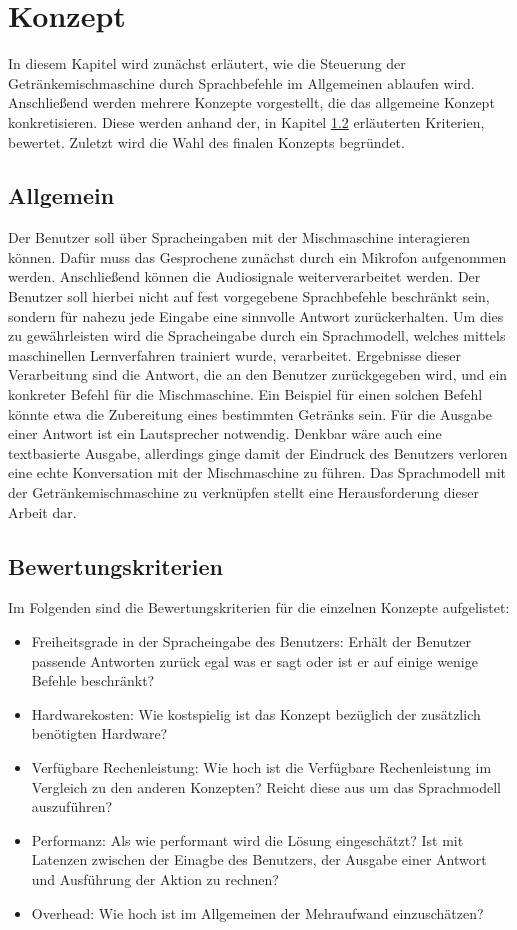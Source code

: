 \chapter{Konzept}
In diesem Kapitel wird zunächst erläutert, wie die Steuerung der Getränkemischmaschine durch Sprachbefehle im Allgemeinen ablaufen wird.
Anschließend werden mehrere Konzepte vorgestellt, die das allgemeine Konzept konkretisieren.
Diese werden anhand der, in Kapitel \ref{section:Bewertungskriterien} erläuterten Kriterien, bewertet.
Zuletzt wird die Wahl des finalen Konzepts begründet.
\section{Allgemein}
Der Benutzer soll über Spracheingaben mit der Mischmaschine interagieren können.
Dafür muss das Gesprochene zunächst durch ein Mikrofon aufgenommen werden.
Anschließend können die Audiosignale weiterverarbeitet werden.
Der Benutzer soll hierbei nicht auf fest vorgegebene Sprachbefehle beschränkt sein, sondern für nahezu jede Eingabe eine sinnvolle Antwort zurückerhalten.
Um dies zu gewährleisten wird die Spracheingabe durch ein Sprachmodell, welches mittels maschinellen Lernverfahren trainiert wurde, verarbeitet.
Ergebnisse dieser Verarbeitung sind die Antwort, die an den Benutzer zurückgegeben wird, und ein konkreter Befehl für die Mischmaschine.
Ein Beispiel für einen solchen Befehl könnte etwa die Zubereitung eines bestimmten Getränks sein.
Für die Ausgabe einer Antwort ist ein Lautsprecher notwendig.
Denkbar wäre auch eine textbasierte Ausgabe, allerdings ginge damit der Eindruck des Benutzers verloren eine echte Konversation mit der Mischmaschine zu führen.
Das Sprachmodell mit der Getränkemischmaschine zu verknüpfen stellt eine Herausforderung dieser Arbeit dar.
\section{Bewertungskriterien} \label{section:Bewertungskriterien}
Im Folgenden sind die Bewertungskriterien für die einzelnen Konzepte aufgelistet:
\begin{itemize}
    \item Freiheitsgrade in der Spracheingabe des Benutzers: Erhält der Benutzer passende Antworten zurück egal was er sagt oder ist er auf einige wenige Befehle beschränkt?
    \item Hardwarekosten: Wie kostspielig ist das Konzept bezüglich der zusätzlich benötigten Hardware?
    \item Verfügbare Rechenleistung: Wie hoch ist die Verfügbare Rechenleistung im Vergleich zu den anderen Konzepten? Reicht diese aus um das Sprachmodell auszuführen?
    \item Performanz: Als wie performant wird die Lösung eingeschätzt? Ist mit Latenzen zwischen der Einagbe des Benutzers, der Ausgabe einer Antwort und Ausführung der Aktion zu rechnen?
    \item Overhead: Wie hoch ist im Allgemeinen der Mehraufwand einzuschätzen?
\end{itemize}
